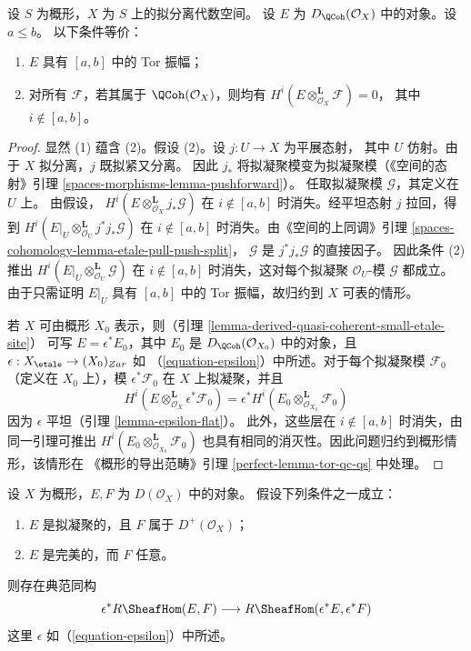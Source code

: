\begin{lemma}
\label{lemma-tor-qc-qs}
设 $S$ 为概形，$X$ 为 $S$ 上的拟分离代数空间。
设 $E$ 为 $D_\QCoh(\mathcal{O}_X)$ 中的对象。设 $a \leq b$。
以下条件等价：
\begin{enumerate}
\item $E$ 具有 $[a, b]$ 中的 Tor 振幅；
\item 对所有 $\mathcal{F}$，若其属于 $\QCoh(\mathcal{O}_X)$，则均有
$H^i(E \otimes_{\mathcal{O}_X}^\mathbf{L} \mathcal{F}) = 0$，
其中 $i \not \in [a, b]$。
\end{enumerate}
\end{lemma}

\begin{proof}
显然 (1) 蕴含 (2)。假设 (2)。设 $j : U \to X$ 为平展态射，
其中 $U$ 仿射。由于 $X$ 拟分离，$j$ 既拟紧又分离。
因此 $j_*$ 将拟凝聚模变为拟凝聚模（《空间的态射》引理
\ref{spaces-morphisms-lemma-pushforward}）。
任取拟凝聚模 $\mathcal{G}$，其定义在 $U$ 上。
由假设，
$H^i(E \otimes_{\mathcal{O}_X}^\mathbf{L} j_*\mathcal{G})$
在 $i \not \in [a, b]$ 时消失。经平坦态射 $j$ 拉回，得到
$H^i(E|_U \otimes_{\mathcal{O}_U}^\mathbf{L} j^*j_*\mathcal{G})$
在 $i \not \in [a, b]$ 时消失。由《空间的上同调》引理
\ref{spaces-cohomology-lemma-etale-pull-push-split}，
$\mathcal{G}$ 是 $j^*j_*\mathcal{G}$ 的直接因子。
因此条件 (2) 推出
$H^i(E|_U \otimes_{\mathcal{O}_U}^\mathbf{L} \mathcal{G})$
在 $i \not \in [a, b]$ 时消失，这对每个拟凝聚
$\mathcal{O}_U$-模 $\mathcal{G}$ 都成立。由于只需证明
$E|_U$ 具有 $[a, b]$ 中的 Tor 振幅，故归约到 $X$ 可表的情形。

\medskip\noindent
若 $X$ 可由概形 $X_0$ 表示，则（引理
\ref{lemma-derived-quasi-coherent-small-etale-site}）
可写 $E = \epsilon^*E_0$，其中 $E_0$ 是
$D_\QCoh(\mathcal{O}_{X_0})$ 中的对象，且
$\epsilon : X_\etale \to (X_0)_{Zar}$ 如
（\ref{equation-epsilon}）中所述。对于每个拟凝聚模
$\mathcal{F}_0$（定义在 $X_0$ 上），模 $\epsilon^*\mathcal{F}_0$ 在 $X$ 上拟凝聚，并且
$$
H^i(E \otimes_{\mathcal{O}_X}^\mathbf{L} \epsilon^*\mathcal{F}_0)
=
\epsilon^*H^i(E_0 \otimes_{\mathcal{O}_{X_0}}^\mathbf{L} \mathcal{F}_0)
$$
因为 $\epsilon$ 平坦（引理 \ref{lemma-epsilon-flat}）。
此外，这些层在 $i \not \in [a, b]$ 时消失，由同一引理可推出
$H^i(E_0 \otimes_{\mathcal{O}_{X_0}}^\mathbf{L} \mathcal{F}_0)$
也具有相同的消灭性。因此问题归约到概形情形，该情形在
《概形的导出范畴》引理 \ref{perfect-lemma-tor-qc-qs} 中处理。
\end{proof}

\begin{lemma}
\label{lemma-descend-RHom}
设 $X$ 为概形，$E, F$ 为 $D(\mathcal{O}_X)$ 中的对象。
假设下列条件之一成立：
\begin{enumerate}
\item $E$ 是拟凝聚的，且 $F$ 属于 $D^+(\mathcal{O}_X)$；
\item $E$ 是完美的，而 $F$ 任意。
\end{enumerate}
则存在典范同构
$$
\epsilon^*R\SheafHom(E, F) \longrightarrow R\SheafHom(\epsilon^*E, \epsilon^*F)
$$
这里 $\epsilon$ 如（\ref{equation-epsilon}）中所述。
\end{lemma}

